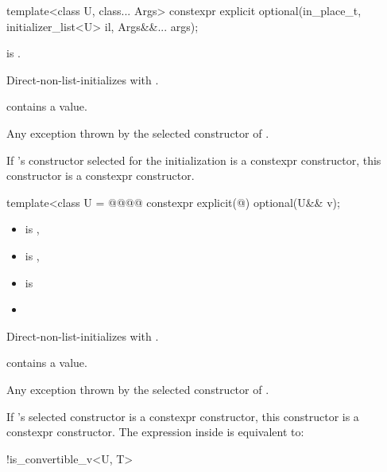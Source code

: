 %
\begin{itemdecl}
template<class U, class... Args>
  constexpr explicit optional(in_place_t, initializer_list<U> il, Args&&... args);
\end{itemdecl}

\begin{itemdescr}
\pnum
\constraints
{} is .

\pnum
\effects
Direct-non-list-initializes  with .

\pnum
\ensures
{} contains a value.

\pnum
\throws
Any exception thrown by the selected constructor of .

\pnum
\remarks
If 's constructor selected for the initialization is a constexpr constructor, this constructor is a constexpr constructor.
\end{itemdescr}

%
\begin{itemdecl}
template<class U = @@@@
  constexpr explicit(@\seebelow@) optional(U&& v);
\end{itemdecl}

\begin{itemdescr}
\pnum
\constraints
\begin{itemize}
\item {} is ,
\item {} is , 
\item {} is 
\item {}\removed{, }
\end{itemize}

\pnum
\effects
Direct-non-list-initializes  with .

\pnum
\ensures
{} contains a value.

\pnum
\throws
Any exception thrown by the selected constructor of .

\pnum
\remarks
If 's selected constructor is a constexpr constructor, this constructor is a constexpr constructor. The expression inside  is equivalent to:
\begin{codeblock}
!is_convertible_v<U, T>
\end{codeblock}
\end{itemdescr}

